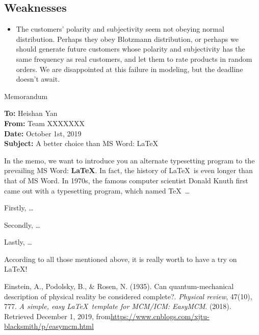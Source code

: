 \documentclass[12pt]{article}  %
\begin{document}
\subsection{Weaknesses}
\begin{itemize}
    \item The customers' polarity and subjectivity seem not obeying normal distribution. Perhaps they obey Blotzmann distribution, or perhaps we should generate future customers whose polarity and subjectivity has the same frequency as real customers, and let them to rate products in random orders. We are disappointed at this failure in modeling, but the deadline doesn't await.
 \end{itemize}


\begin{letter}{Memorandum}
\begin{flushleft}  %
\textbf{To:} Heishan Yan\\
\textbf{From:} Team XXXXXXX\\
\textbf{Date:} October 1st, 2019\\
\textbf{Subject:} A better choice than MS Word: \LaTeX
\end{flushleft}

In the memo, we want to introduce you an alternate typesetting program to the prevailing MS Word: \textbf{\LaTeX}. In fact, the history of \LaTeX\ is even longer than that of MS Word. In 1970s, the famous computer scientist Donald Knuth first came out with a typesetting program, which named \TeX\ \ldots

Firstly, \ldots

Secondly, \ldots

Lastly, \ldots

According to all those mentioned above, it is really worth to have a try on \LaTeX! 
\end{letter}


\begin{thebibliography}{99}
 Einstein, A., Podolsky, B., \& Rosen, N. (1935). Can quantum-mechanical description of physical reality be considered complete?. \emph{Physical review}, 47(10), 777.
 \emph{A simple, easy \LaTeX\ template for MCM/ICM: EasyMCM}. (2018). Retrieved December 1, 2019, from\url{https://www.cnblogs.com/xjtu-blacksmith/p/easymcm.html}
\end{thebibliography}
\end{document}
